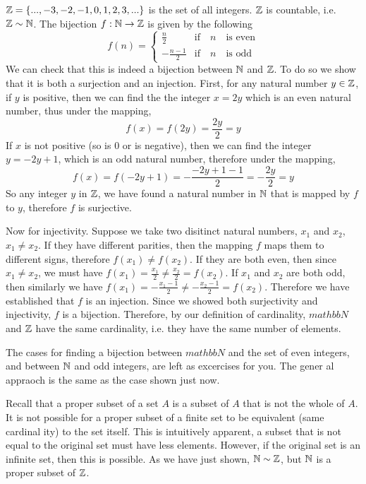 \documentclass[../../templates/section]{subfiles}
\begin{document}
\begin{example}
$\mathbb{Z}=\{...,-3,-2,-1,0,1,2,3,...\}$ is the set of all integers. $\mathbb{Z}$ is
countable, i.e. $\mathbb{Z} \sim \mathbb{N}$. The bijection 
$f:\mathbb{N} \rightarrow \mathbb{Z}$ is given by the following
\[ 
f(n) =
\begin{cases} 
    \frac{n}{2}      & \text{if} \quad n \quad \text{is even} \\
    -\frac{n - 1}{2} & \text{if} \quad n \quad \text{is odd}
\end{cases}
\]
We can check that this is indeed a bijection between $\mathbb{N}$ and $\mathbb{Z}$.
To do so we show that it is both a surjection and an injection. First, for any natural 
number $y\in \mathbb{Z}$, if $y$ is positive, then we can find the the integer $x = 2y$ 
which is an even natural number, thus under the mapping, 
\[
f(x) = f(2y) = \frac{2y}{2} = y
\] 
If $x$ is not positive (so is 0 or is negative), then we can find the integer 
$y = -2y + 1$, which is an odd natural number, therefore under the mapping,
\[
f(x) = f(-2y + 1) = -\frac{-2y + 1 - 1}{2} = -\frac{2y}{2} = y
\]
So any integer $y$ in $\mathbb{Z}$, we have found a natural number in $\mathbb{N}$ 
that is mapped by $f$ to $y$, therefore $f$ is surjective.

Now for injectivity. Suppose we take two disitinct natural numbers, $x_1$ and $x_2$, 
$x_1\neq x_2$. If they have different parities, then the mapping $f$ maps them to 
different signs, therefore $f(x_1)\neq f(x_2)$. If they are both even, then since 
$x_1\neq x_2$, we must have $f(x_1)=\frac{x_1}{2}\neq \frac{x_2}{2}=f(x_2)$. If $x_1$
 and $x_2$ are both odd, then similarly we have 
$f(x_1) = -\frac{x_1-1}{2}\neq -\frac{x_2-1}{2}=f(x_2)$. Therefore we have established 
that $f$ is an injection. Since we showed both surjectivity and injectivity, $f$ is 
a bijection. Therefore, by our definition of cardinality, $mathbb{N}$ and $\mathbb{Z}$ 
have the same cardinality, i.e. they have the same number of elements.

The cases for finding a bijection between $mathbb{N}$ and the set of even integers, 
and between $\mathbb{N}$ and odd integers, are left as excercises for you. The gener
al appraoch is the same as the case shown just now.
\end{example} 

\begin{remark}
Recall that a proper subset of a set $A$ is a subset of $A$ that is not the whole of $A$. 
It is not possible for a proper subset of a finite set to be equivalent (same cardinal
ity) to the set itself. This is intuitively apparent, a subset that is not equal to the 
original set must have less elements. However, if the original set is an infinite set, 
then this is possible. As we have just shown, $\mathbb{N}\sim\mathbb{Z}$, but $\mathbb{N}$ 
is a proper subset of $\mathbb{Z}$. 
\end{remark}
\end{document}
